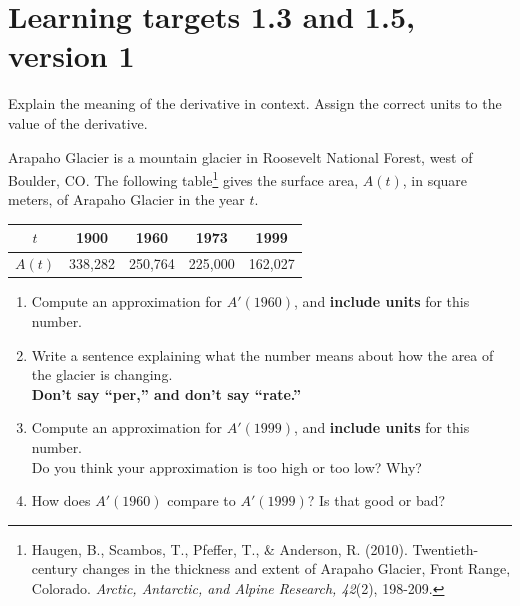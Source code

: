 
\usepackage{pgfplots}



\section{Learning targets 1.3 and 1.5, version 1}

Explain the meaning of the derivative in context. Assign the correct units to the value of the derivative.

\hrulefill

Arapaho Glacier is a mountain glacier in Roosevelt National Forest,
west of Boulder, CO. The following table\footnote{
Haugen, B., Scambos, T., Pfeffer, T., \& Anderson, R. (2010). Twentieth-century changes in the thickness and extent of Arapaho Glacier, Front Range, Colorado. \textit{Arctic, Antarctic, and Alpine Research, 42}(2), 198-209.}
gives the surface area, $A(t)$, in square meters, of Arapaho Glacier in the year $t$. 
\begin{center}
	\begin{tabular}{|c|c|c|c|c|}
	\hline
	$t$ & 1900 & 1960 & 1973 & 1999\\
	\hline
	$A(t)$ & 338,282 & 250,764 & 225,000 & 162,027\\
	\hline
	\end{tabular}
 \end{center}
	
\begin{enumerate}[leftmargin=0pt]

\item Compute an approximation for $A'(1960)$, and {\bf include units} for this number.
\vfill
\item Write a sentence explaining what the number means about how the area of the glacier is changing.\\
\textbf{Don't say ``per,'' and don't say ``rate.''}

\vfill
\vfill

\item Compute an approximation for $A'(1999)$, and {\bf include units} for this number.\\
Do you think your approximation is too high or too low? Why?

\vfill
\vfill

\item How does $A'(1960)$ compare to $A'(1999)$? Is that good or bad?
\vfill
\end{enumerate}

